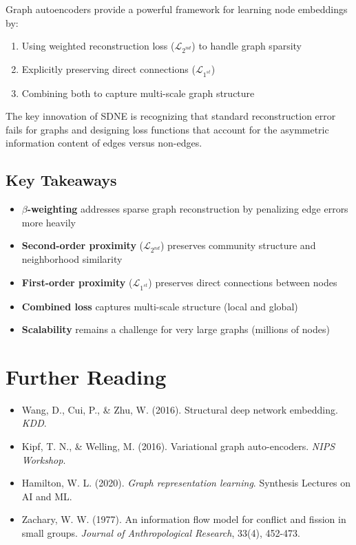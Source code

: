 \begin{notechapter}
Graph autoencoders provide a powerful framework for learning node embeddings by:
\begin{enumerate}
    \item Using weighted reconstruction loss ($\mathcal{L}_{2^{nd}}$) to handle graph sparsity
    \item Explicitly preserving direct connections ($\mathcal{L}_{1^{st}}$)
    \item Combining both to capture multi-scale graph structure
\end{enumerate}

The key innovation of SDNE is recognizing that standard reconstruction error fails for graphs and designing loss functions that account for the asymmetric information content of edges versus non-edges.

\subsection{Key Takeaways}

\begin{tcolorbox}[colback=purple!5!white,colframe=purple!75!black,title=Summary]
\begin{itemize}
    \item \textbf{$\beta$-weighting} addresses sparse graph reconstruction by penalizing edge errors more heavily
    \item \textbf{Second-order proximity} ($\mathcal{L}_{2^{nd}}$) preserves community structure and neighborhood similarity
    \item \textbf{First-order proximity} ($\mathcal{L}_{1^{st}}$) preserves direct connections between nodes
    \item \textbf{Combined loss} captures multi-scale structure (local and global)
    \item \textbf{Scalability} remains a challenge for very large graphs (millions of nodes)
\end{itemize}
\end{tcolorbox}

\section*{Further Reading}

\begin{itemize}
    \item Wang, D., Cui, P., \& Zhu, W. (2016). Structural deep network embedding. \textit{KDD}.
    \item Kipf, T. N., \& Welling, M. (2016). Variational graph auto-encoders. \textit{NIPS Workshop}.
    \item Hamilton, W. L. (2020). \textit{Graph representation learning}. Synthesis Lectures on AI and ML.
    \item Zachary, W. W. (1977). An information flow model for conflict and fission in small groups. \textit{Journal of Anthropological Research}, 33(4), 452-473.
\end{itemize}
\end{notechapter}
